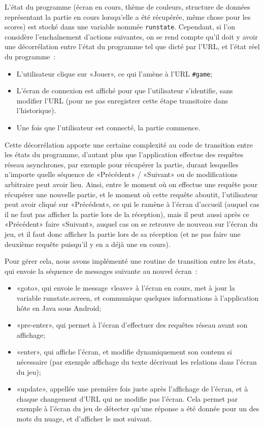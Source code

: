 \documentclass[a4paper,11pt,french]{article}
\begin{document}
L'état du programme (écran en cours, thème de couleurs, structure de données représentant la partie en cours lorsqu'elle a été récupérée,
même chose pour les scores) est stocké dans une variable nommée \verb!runstate!. Cependant, si l'on considère l'enchaînement d'actions
suivantes, on se rend compte qu'il doit y avoir une décorrélation entre l'état du programme tel que dicté par l'URL, et l'état réel du
programme~:
\begin{itemize}
\item L'utilisateur clique sur «Jouer», ce qui l'amène à l'URL \verb!#game!;
\item L'écran de connexion est affiché pour que l'utilisateur s'identifie, sans modifier l'URL (pour ne pas enregistrer cette étape
  transitoire dans l'historique).
\item Une fois que l'utilisateur est connecté, la partie commence.
\end{itemize}
Cette décorrélation apporte une certaine complexité au code de transition entre les états du programme, d'autant plus que l'application
effectue des requêtes réseau asynchrones, par exemple pour récupérer la partie, durant lesquelles n'importe quelle séquence de «Précédent» /
«Suivant» ou de modifications arbitraire peut avoir lieu. Ainsi, entre le moment où on effectue une requête pour récupérer une nouvelle
partie, et le moment où cette requête aboutit, l'utilisateur peut avoir cliqué sur «Précédent», ce qui le ramène à l'écran d'accueil (auquel
cas il ne faut pas afficher la partie lors de la réception), mais il peut aussi après ce «Précédent» faire «Suivant», auquel cas on se
retrouve de nouveau sur l'écran du jeu, et il faut donc afficher la partie lors de sa réception (et ne pas faire une deuxième requête
puisqu'il y en a déjà une en cours).

Pour gérer cela, nous avons implémenté une routine de transition entre les états, qui envoie la séquence de messages suivante au nouvel
écran~:
\begin{itemize}
\item «goto», qui envoie le message «leave» à l'écran en cours, met à jour la variable runstate.screen, et communique quelques informations
  à l'application hôte en Java sous Android;
\item «pre-enter», qui permet à l'écran d'effectuer des requêtes réseau avant son affichage;
\item «enter», qui affiche l'écran, et modifie dynamiquement son contenu si nécessaire (par exemple affichage du texte décrivant les
  relations dans l'écran du jeu);
\item «update», appellée une première fois juste après l'affichage de l'écran, et à chaque changement d'URL qui ne modifie pas l'écran. Cela
  permet par exemple à l'écran du jeu de détecter qu'une réponse a été donnée pour un des mots du nuage, et d'afficher le mot suivant.
\end{itemize}
\end{document}
